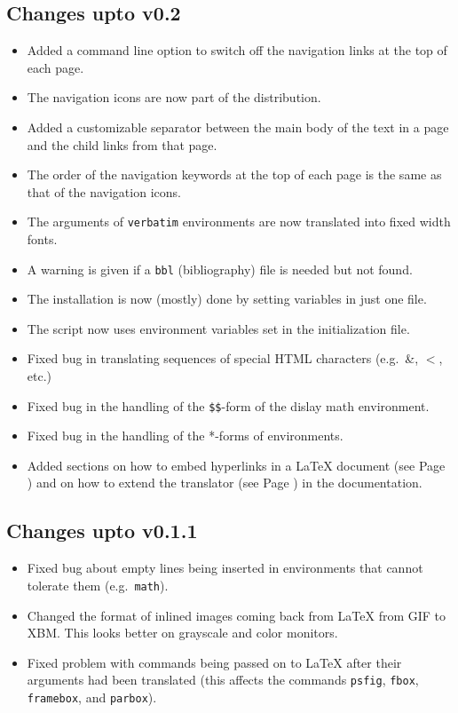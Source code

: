 \subsection{Changes upto v0.2}
\begin{itemize}
\item Added a command line option
to switch off the navigation links
at the top of each page.
\item The navigation icons are now part of the distribution.
\item Added a customizable separator between the main body of the text
in a page and the child links from that page.
\item The order of the navigation keywords at the top of each page is
the same as that of the navigation icons.
\item The arguments of \texttt{verbatim} environments are now translated
into fixed width fonts.
\item A warning is given if a \texttt{bbl} (bibliography) file is 
needed but not found.
\item The installation is now (mostly) done by setting variables in 
just one file.
\item The  script now uses environment variables
set in the initialization file.
\item Fixed bug in translating sequences of special HTML characters
(e.g.\ \&, $<$, etc.)
\item Fixed bug in the handling of the \verb|$$|-form of the dislay
math environment.
\item Fixed bug in the handling of the *-forms of environments.
\item Added sections on how to embed hyperlinks in a LaTeX document 
(see Page \pageref{sec:hyper}) and on how to extend the translator
(see Page \pageref{sec:extend}) in the documentation.
\end{itemize}

\subsection{Changes upto v0.1.1}
\begin{itemize}
\item Fixed bug about empty lines being inserted in environments that
cannot tolerate them (e.g.\ \texttt{math}).
\item Changed the format of inlined images coming back from LaTeX
from GIF to XBM. This looks better on grayscale and color monitors.
\item Fixed problem with commands being passed on to LaTeX  after
their
arguments had been translated (this affects the commands 
\texttt{psfig}, \texttt{fbox}, \texttt{framebox}, and \texttt{parbox}).
\end{itemize}
